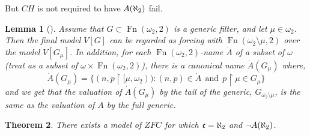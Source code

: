 \documentclass{amsart}
\theoremstyle{plain}
\newtheorem{theorem}{Theorem}
\newtheorem{lemma}[theorem]{Lemma}
\theoremstyle{definition}
\theoremstyle{remark}
\theoremstyle{plain}
\theoremstyle{definition}
\theoremstyle{remark}
\begin{document}
  But \(CH\) is not required to have \(A(\aleph_2)\) fail.


            \begin{lemma}[\cite{MR597342}]
            Assume that $G\subset \operatorname{Fn}(\omega_2,2)$ is a generic filter,
             and let $\mu\in \omega_2$. Then the final model $V[G]$ can be
             regarded as forcing  with $\operatorname{Fn}(\omega_2\setminus \mu,
             2)$ over the model $V[G_\mu]$.
            In addition, for each $\operatorname{Fn}(\omega_2,2)$-name $\dot A$
            of a subset of $\omega$ (treat as a subset of $\omega\times
            \operatorname{Fn}(\omega_2,2) $),
            there is a canonical name $\dot A(G_\mu)$ where,
            $$\dot A(G_\mu) = \{ (n,p\restriction [\mu,\omega_2))  :
             (n,p)\in \dot A\ \ \mbox{and} \ \ p\restriction \mu\in G_\mu\}$$
            and we get that the valuation of $\dot A(G_\mu)$ by the tail
            of the generic, $G_{\omega_2\setminus \mu}$, is the same as
            the valuation of $\dot A$ by the full generic.
            \end{lemma}


            \begin{theorem}
              There exists a model of \(ZFC\) for which \(\mathfrak{c}=\aleph_2\)
              and \(\neg A(\aleph_2)\).
            \end{theorem}
\end{document}

